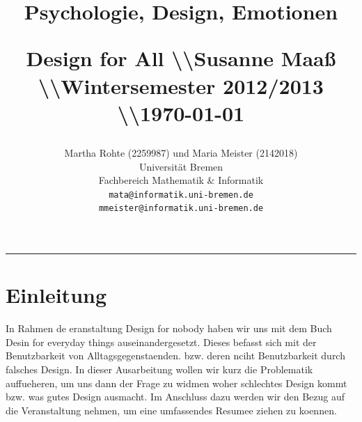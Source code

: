 \documentclass[parskip,headsepline, headtopline, %
footsepline, oneside, 12pt, headings=small]{scrreprt}
\title{ \fontsize{50}{60}\selectfont \vspace{2.10cm}
\hfill \begin{huge}{\fontfamily{@arialn}\selectfont {\fontfamily{txtt}\selectfont The Design for All}}\end{huge}
 \hfill \large{\begin{flushright}Psychologie, Design, Emotionen\end{flushright}} \vspace{1.9cm}
 \hfill \small{Design for All \textbackslash\textbackslash Susanne Maaß \textbackslash\textbackslash  Wintersemester 2012/2013 \textbackslash\textbackslash  \today} 
}
\author{
                \hfill Martha Rohte (2259987) und Maria Meister (2142018)\\  
                \hfill Universität Bremen\\   
                \hfill Fachbereich Mathematik \& Informatik \\
        \hfill \texttt{\fontfamily{cmr}\selectfont mata@informatik.uni-bremen.de} \\
        \hfill \texttt{\fontfamily{cmr}\selectfont mmeister@informatik.uni-bremen.de} \\
}
\makeatletter
\newcommand{\HRule}[1]{\hfill \rule{0.2\linewidth}{#1}}         %
\def\printtitle{%
    {\centering \@title\par}}
\def\printauthor{%
    {\centering \large \@author}}
\makeatother
\begin{document}
\thispagestyle{empty}                           %



\colorbox{grey}{
        \parbox[t]{1.14\linewidth}{
                \printtitle 
                \vspace*{0.2cm}               
        }
}
        \vfill
\printauthor                                                            %
\HRule{1pt}

\clearpage




\tableofcontents
 \clearpage

\chapter*{Einleitung}


In Rahmen de eranstaltung Design for nobody haben wir uns mit dem Buch Desin for everyday things auseinandergesetzt. Dieses befasst sich mit der  Benutzbarkeit von Alltagsgegenstaenden. bzw. deren nciht Benutzbarkeit durch falsches Design. In dieser Ausarbeitung wollen wir kurz die Problematik auffueheren,  um uns dann der Frage zu widmen woher schlechtes Design kommt bzw. was gutes Design ausmacht. Im Anschluss dazu werden wir den Bezug auf die Veranstaltung nehmen, um eine umfassendes Resumee ziehen zu koennen.
\end{document}
